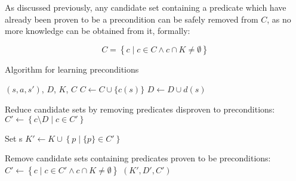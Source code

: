 \documentclass[../../Master.tex]{subfiles}
\begin{document}
As discussed previously, any candidate set containing a predicate which have already been proven to be a precondition can be safely removed from $C$, as no more knowledge can be obtained from it, formally:

\begin{equation} \label{eq:removeKnown}
    C = \left\{ c \; | \; c \in C \land c \cap K \neq \emptyset \right\}
\end{equation}

\begin{algorithm}
    \caption{Algorithm for learning preconditions}
    \label{algo:precondLearn}

    \begin{algorithmic}
         {$\left( s, a, s'\right)$, $D$, $K$, $C$}
            \State {}
                \State $C \gets C \cup \{ c(s) \}$
                \State $D \gets D \cup d(s)$
            \EndIf

            \State Reduce candidate sets by removing predicates disproven to preconditions:
            \State $C' \gets \left\{ c \setminus D \; | \; c \in C' \right\}$

            \State Set s
            \State $K' \gets K \cup \left\{ p \; | \; \{ p \} \in C' \right\}$

            \State Remove candidate sets containing predicates proven to be preconditions:
            \State $C' \gets \left\{ c \; | \; c \in C' \land c \cap K \neq \emptyset \right\}$
            \State \Return $(K', D', C')$
        \EndFunction
    \end{algorithmic}
\end{algorithm}
\end{document}
